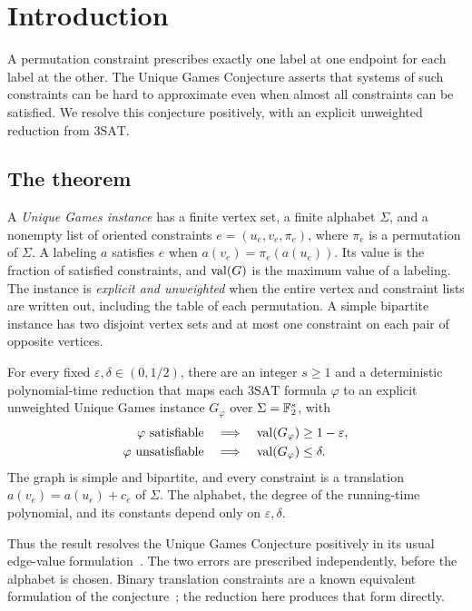 \section{Introduction}\label{sec:introduction}

A permutation constraint prescribes exactly one label at one endpoint for
each label at the other. The Unique Games Conjecture asserts that systems
of such constraints can be hard to approximate even when almost all
constraints can be satisfied. We resolve this conjecture positively, with an
explicit unweighted reduction from \(\mathrm{3SAT}\).

\subsection{The theorem}

A \emph{Unique Games instance} has a finite vertex set, a finite alphabet
\(\Sigma\), and a nonempty list of oriented constraints
\(e=(u_e,v_e,\pi_e)\), where \(\pi_e\) is a permutation of \(\Sigma\).
A labeling \(a\) satisfies \(e\) when
\(a(v_e)=\pi_e(a(u_e))\). Its value is the fraction of satisfied
constraints, and \(\operatorname{val}(G)\) is the maximum value of a labeling.
The instance is \emph{explicit and unweighted} when the entire vertex
and constraint lists are written out, including the table of each
permutation. A simple bipartite instance has two disjoint vertex sets
and at most one constraint on each pair of opposite vertices.

\begin{theorem}\label{thm:ugc}
For every fixed \(\varepsilon,\delta\in(0,1/2)\), there are an integer
\(s\ge1\) and a deterministic polynomial-time reduction that maps each
\(\mathrm{3SAT}\) formula \(\varphi\) to an explicit unweighted Unique
Games instance \(G_\varphi\) over \(\Sigma=\mathbb F_2^s\), with
\[
\begin{aligned}
 \varphi\text{ satisfiable}
 &\quad\Longrightarrow\quad \operatorname{val}(G_\varphi)\ge1-\varepsilon,\\
 \varphi\text{ unsatisfiable}
 &\quad\Longrightarrow\quad \operatorname{val}(G_\varphi)\le\delta.
\end{aligned}
\]
The graph is simple and bipartite, and every constraint is a translation
\(a(v_e)=a(u_e)+c_e\) of \(\Sigma\). The alphabet, the degree of the
running-time polynomial, and its constants depend only on
\(\varepsilon,\delta\).
\end{theorem}

Thus the result resolves the Unique Games Conjecture positively in its
usual edge-value formulation~\cite[Conjecture~2.5]{Khot10}.
The two errors are prescribed independently, before the alphabet is chosen.
Binary translation constraints are a known equivalent formulation of the
conjecture~\cite[Corollary~13 and Section~11.1]{KKMO07}; the reduction
here produces that form directly.

